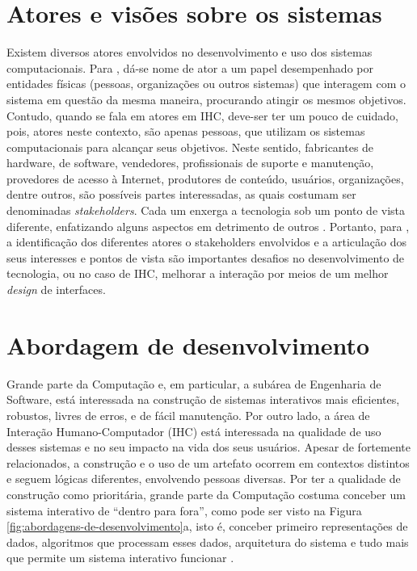 \section{Atores e visões sobre os sistemas}
Existem diversos atores envolvidos no desenvolvimento e uso dos sistemas computacionais. Para , dá-se nome de ator a um papel desempenhado por entidades físicas (pessoas, organizações ou outros sistemas) que interagem com o sistema em questão da mesma maneira, procurando atingir os mesmos objetivos. Contudo, quando se fala em atores em IHC, deve-ser ter um pouco de cuidado, pois, atores neste contexto, são apenas pessoas, que utilizam os sistemas computacionais para alcançar seus objetivos. Neste sentido, fabricantes de hardware, de software, vendedores, profissionais de suporte e manutenção, provedores de acesso à Internet, produtores de conteúdo, usuários, organizações, dentre outros, são possíveis partes interessadas, as quais costumam ser denominadas \textit{stakeholders}. Cada um enxerga a tecnologia sob um ponto de vista diferente, enfatizando alguns aspectos em detrimento de outros \cite{barbosa2010IHC}. Portanto, para , a identificação dos diferentes atores o stakeholders envolvidos e a articulação dos seus interesses e pontos de vista são importantes desafios no desenvolvimento de tecnologia, ou no caso de IHC, melhorar a interação por meios de um melhor \textit{design} de interfaces.

\section{Abordagem de desenvolvimento}
Grande parte da Computação e, em particular, a subárea de Engenharia de Software, está interessada na construção de sistemas interativos mais eficientes, robustos, livres de erros, e de fácil manutenção. Por outro lado, a área de Interação Humano-Computador (IHC) está interessada na qualidade de uso desses sistemas e no seu impacto na vida dos seus usuários. Apesar de fortemente relacionados, a construção e o uso de um artefato ocorrem em contextos distintos e seguem lógicas diferentes, envolvendo pessoas diversas. Por ter a qualidade de construção como prioritária, grande parte da Computação costuma conceber um sistema interativo de ``dentro para fora'', como pode ser visto na Figura \ref{fig:abordagens-de-desenvolvimento}a, isto é, conceber primeiro representações de dados, algoritmos que processam esses dados, arquitetura do sistema e tudo mais que permite um sistema interativo funcionar \cite{barbosa2010IHC}.

